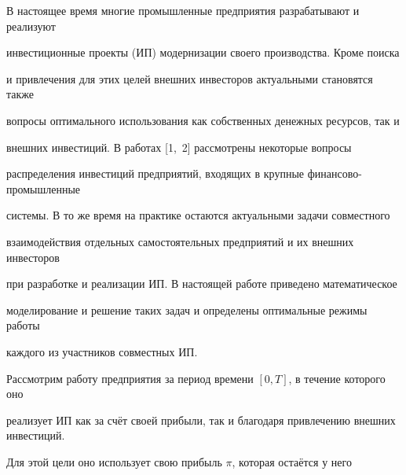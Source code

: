 \date{08/XII/2009} %









\maketitle

\small






В настоящее время многие промышленные предприятия разрабатывают и реализуют 

инвестиционные проекты (ИП) модернизации своего производства. Кроме поиска 

и привлечения для этих целей внешних инвесторов актуальными становятся также 

вопросы оптимального использования как собственных денежных ресурсов, так и 

внешних инвестиций. В работах [1,~2]  рассмотрены некоторые вопросы 

распределения инвестиций предприятий, входящих в крупные финансово-промышленные 

системы. В то же время на практике остаются актуальными задачи совместного 

взаимодействия отдельных самостоятельных предприятий и их внешних инвесторов 

при разработке и реализации ИП. В настоящей работе приведено математическое 

моделирование и решение таких задач и определены оптимальные режимы работы 

каждого из участников совместных ИП.




Рассмотрим работу предприятия за период времени $[0, T]$, в течение которого оно 

реализует ИП как за счёт своей прибыли, так и благодаря привлечению внешних инвестиций. 

Для этой цели оно использует свою прибыль $\pi$, которая остаётся у него 

